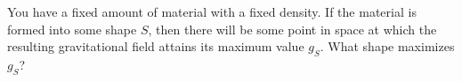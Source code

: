 You have a fixed amount of material with a fixed density. If the material
is formed into some shape $S$, then there will be some point in space at which
the resulting gravitational field attains its maximum value $g_S$. What shape
maximizes $g_S$?
